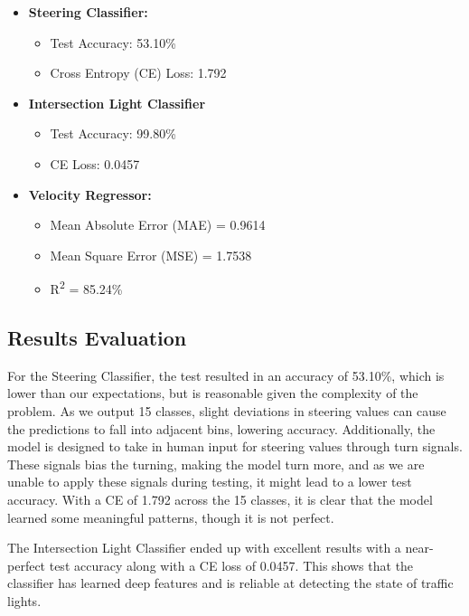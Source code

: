 \documentclass{article} %
\begin{document}
\begin{itemize}
    \item \textbf{Steering Classifier:}
    \begin{itemize}
        \item Test Accuracy: 53.10\%
        \item Cross Entropy (CE) Loss: 1.792
    \end{itemize}

    \item \textbf{Intersection Light Classifier}
    \begin{itemize}
        \item Test Accuracy: 99.80\%
        \item CE Loss: 0.0457
    \end{itemize}

    \item \textbf{Velocity Regressor:}
    \begin{itemize}
        \item Mean Absolute Error (MAE) = 0.9614
        \item Mean Square Error (MSE) = 1.7538
        \item R\textsuperscript{2} = 85.24\%
    \end{itemize}
\end{itemize}

\subsection{Results Evaluation}
For the Steering Classifier, the test resulted in an accuracy of 53.10\%, 
which is lower than our expectations, but is reasonable given the complexity of the problem. As we output 15 classes, 
slight deviations in steering values can cause the predictions to fall into adjacent bins, lowering accuracy. 
Additionally, the model is designed to take in human input for steering values through turn signals. 
These signals bias the turning, making the model turn more, and as we are unable to apply these signals during testing, 
it might lead to a lower test accuracy. With a CE of 1.792 across the 15 classes, it is clear that the model learned some meaningful patterns, 
though it is not perfect.

The Intersection Light Classifier ended up with excellent results with a near-perfect test accuracy along with a CE loss of 0.0457. 
This shows that the classifier has learned deep features and is reliable at detecting the state of traffic lights. 
\end{document}
